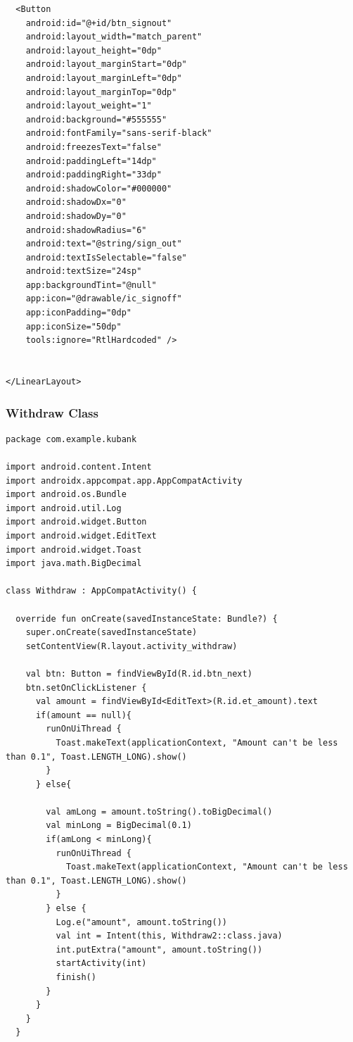 \documentclass[11pt, a4paper]{article}
\begin{document}
\begin{appendices}
\begin{lstlisting}
  <Button
    android:id="@+id/btn_signout"
    android:layout_width="match_parent"
    android:layout_height="0dp"
    android:layout_marginStart="0dp"
    android:layout_marginLeft="0dp"
    android:layout_marginTop="0dp"
    android:layout_weight="1"
    android:background="#555555"
    android:fontFamily="sans-serif-black"
    android:freezesText="false"
    android:paddingLeft="14dp"
    android:paddingRight="33dp"
    android:shadowColor="#000000"
    android:shadowDx="0"
    android:shadowDy="0"
    android:shadowRadius="6"
    android:text="@string/sign_out"
    android:textIsSelectable="false"
    android:textSize="24sp"
    app:backgroundTint="@null"
    app:icon="@drawable/ic_signoff"
    app:iconPadding="0dp"
    app:iconSize="50dp"
    tools:ignore="RtlHardcoded" />


</LinearLayout>
\end{lstlisting}
\subsubsection{Withdraw Class}
\begin{lstlisting}
package com.example.kubank

import android.content.Intent
import androidx.appcompat.app.AppCompatActivity
import android.os.Bundle
import android.util.Log
import android.widget.Button
import android.widget.EditText
import android.widget.Toast
import java.math.BigDecimal

class Withdraw : AppCompatActivity() {

  override fun onCreate(savedInstanceState: Bundle?) {
    super.onCreate(savedInstanceState)
    setContentView(R.layout.activity_withdraw)

    val btn: Button = findViewById(R.id.btn_next)
    btn.setOnClickListener {
      val amount = findViewById<EditText>(R.id.et_amount).text
      if(amount == null){
        runOnUiThread {
          Toast.makeText(applicationContext, "Amount can't be less than 0.1", Toast.LENGTH_LONG).show()
        }
      } else{

        val amLong = amount.toString().toBigDecimal()
        val minLong = BigDecimal(0.1)
        if(amLong < minLong){
          runOnUiThread {
            Toast.makeText(applicationContext, "Amount can't be less than 0.1", Toast.LENGTH_LONG).show()
          }
        } else {
          Log.e("amount", amount.toString())
          val int = Intent(this, Withdraw2::class.java)
          int.putExtra("amount", amount.toString())
          startActivity(int)
          finish()
        }
      }
    }
  }


\end{lstlisting}
\end{appendices}
\end{document}
